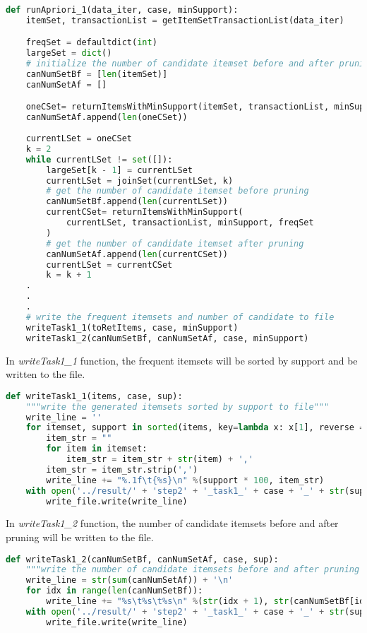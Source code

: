 \documentclass[a4paper, oneside, final, 12pt]{scrartcl} %
\begin{document}
\begin{lstlisting}[language=Python]
  def runApriori_1(data_iter, case, minSupport):
    itemSet, transactionList = getItemSetTransactionList(data_iter)

    freqSet = defaultdict(int)
    largeSet = dict()
    # initialize the number of candidate itemset before and after pruning
    canNumSetBf = [len(itemSet)]
    canNumSetAf = []

    oneCSet= returnItemsWithMinSupport(itemSet, transactionList, minSupport, freqSet)
    canNumSetAf.append(len(oneCSet))
    
    currentLSet = oneCSet
    k = 2
    while currentLSet != set([]):    
        largeSet[k - 1] = currentLSet
        currentLSet = joinSet(currentLSet, k)
        # get the number of candidate itemset before pruning
        canNumSetBf.append(len(currentLSet))
        currentCSet= returnItemsWithMinSupport(
            currentLSet, transactionList, minSupport, freqSet
        )
        # get the number of candidate itemset after pruning
        canNumSetAf.append(len(currentCSet))
        currentLSet = currentCSet
        k = k + 1
    .
    .
    .
    # write the frequent itemsets and number of candidate to file
    writeTask1_1(toRetItems, case, minSupport)
    writeTask1_2(canNumSetBf, canNumSetAf, case, minSupport)
\end{lstlisting}

In \emph{writeTask1\_1} function, the frequent itemsets will be 
sorted by support and be written to the file.

\begin{lstlisting}[language=Python]
  def writeTask1_1(items, case, sup):
    """write the generated itemsets sorted by support to file"""
    write_line = ''
    for itemset, support in sorted(items, key=lambda x: x[1], reverse = True):
        item_str = ""
        for item in itemset:
            item_str = item_str + str(item) + ','
        item_str = item_str.strip(',')
        write_line += "%.1f\t{%s}\n" %(support * 100, item_str)
    with open('../result/' + 'step2' + '_task1_' + case + '_' + str(sup) + '_result1.txt', mode = 'w') as write_file:
        write_file.write(write_line)
\end{lstlisting}

In \emph{writeTask1\_2} function, the number of candidate itemsets before and after pruning
will be written to the file.

\begin{lstlisting}[language=Python]
  def writeTask1_2(canNumSetBf, canNumSetAf, case, sup):
    """write the number of candidate itemsets before and after pruning to file"""
    write_line = str(sum(canNumSetAf)) + '\n'
    for idx in range(len(canNumSetBf)):
        write_line += "%s\t%s\t%s\n" %(str(idx + 1), str(canNumSetBf[idx]), str(canNumSetAf[idx]))
    with open('../result/' + 'step2' + '_task1_' + case + '_' + str(sup) + '_result2.txt', mode = 'w') as write_file:
        write_file.write(write_line)
\end{lstlisting}
\end{document}
